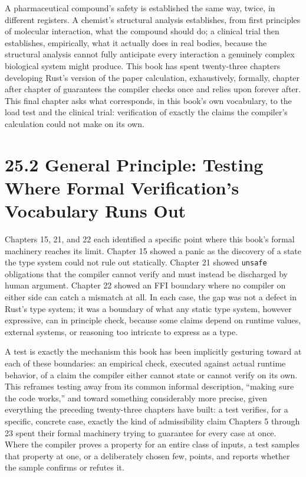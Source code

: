 \documentclass[11pt]{book}
\begin{document}
A pharmaceutical compound's safety is established the same way, twice, in different registers. A chemist's structural analysis establishes, from first principles of molecular interaction, what the compound should do; a clinical trial then establishes, empirically, what it actually does in real bodies, because the structural analysis cannot fully anticipate every interaction a genuinely complex biological system might produce. This book has spent twenty-three chapters developing Rust's version of the paper calculation, exhaustively, formally, chapter after chapter of guarantees the compiler checks once and relies upon forever after. This final chapter asks what corresponds, in this book's own vocabulary, to the load test and the clinical trial: verification of exactly the claims the compiler's calculation could not make on its own.

\section*{25.2 General Principle: Testing Where Formal Verification's Vocabulary Runs Out}

Chapters 15, 21, and 22 each identified a specific point where this book's formal machinery reaches its limit. Chapter 15 showed a panic as the discovery of a state the type system could not rule out statically. Chapter 21 showed \texttt{unsafe} obligations that the compiler cannot verify and must instead be discharged by human argument. Chapter 22 showed an FFI boundary where no compiler on either side can catch a mismatch at all. In each case, the gap was not a defect in Rust's type system; it was a boundary of what any static type system, however expressive, can in principle check, because some claims depend on runtime values, external systems, or reasoning too intricate to express as a type.

A test is exactly the mechanism this book has been implicitly gesturing toward at each of these boundaries: an empirical check, executed against actual runtime behavior, of a claim the compiler either cannot state or cannot verify on its own. This reframes testing away from its common informal description, ``making sure the code works,'' and toward something considerably more precise, given everything the preceding twenty-three chapters have built: a test verifies, for a specific, concrete case, exactly the kind of admissibility claim Chapters 5 through 23 spent their formal machinery trying to guarantee for every case at once. Where the compiler proves a property for an entire class of inputs, a test samples that property at one, or a deliberately chosen few, points, and reports whether the sample confirms or refutes it.
\end{document}
